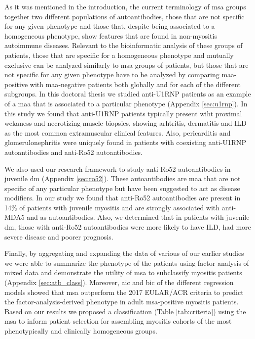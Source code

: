 As it was mentioned in the introduction, the current terminology of \gls{msa} groups together two different populations of autoantibodies, those that are not specific for any given phenotype and those that, despite being associated to a homogeneous phenotype, show features that are found in non-myositis autoimmune diseases. Relevant to the bioinformatic analysis of these groups of patients, those that are specific for a homogeneous phenotype and mutually exclusive can be analyzed similarly to \gls{msa} groups of patients, but those that are not specific for any given phenotype have to be analyzed by comparing \gls{maa}-positive with \gls{maa}-negative patients both globally and for each of the different subgroups. In this doctoral thesis we studied anti-U1RNP patients as an example of a \gls{maa} that is associated to a particular phenotype (Appendix \autoref{sec:u1rnp}). In this study we found that anti-U1RNP patients typically present wiht proximal wekaness and necrotizing muscle biopsies, showing arhtritis, dermatitis and ILD as the most common extramuscular clinical features. Also, pericarditis and glomerulonephritis were uniquely found in patients with coexisting anti-U1RNP autoantibodies and anti-Ro52 autoantibodies.

We also used our research framework to study anti-Ro52 autoantibodies in juvenile \gls{dm} (Appendix \autoref{sec:ro52}). These autoantibodies are \gls{maa} that are not specific of any particular phenotype but have been suggested to act as disease modifiers. In our study we found that anti-Ro52 autoantibodies are present in 14\% of patients with juvenile myositis and are strongly associated with anti-MDA5 and \gls{as} autoantibodies. Also, we determined that in patients with juvenile \gls{dm}, those with anti-Ro52 autoantibodies were more likely to have ILD, had more severe disease and poorer prognosis.

Finally, by aggregating and expanding the data of various of our earlier studies we were able to summarize the phenotype of the patients using factor analysis of mixed data and demonstrate the utility of \gls{msa} to subclassify myositis patients (Appendix \autoref{sec:atb_class}). Moreover, \gls{aic} and \gls{bic} of the different regression models showed that \gls{msa} outperform the 2017 EULAR/ACR criteria to predict the factor-analysis-derived phenotype in adult \gls{msa}-positive myositis patients. Based on our results we proposed a classification (Table \ref{tab:criteria}) using the \gls{msa} to inform patient selection for assembling myositis cohorts of the most phenotypically and clinically homogeneous groups.

